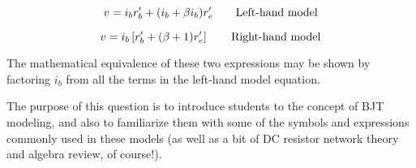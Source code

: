 $$v = i_b r'_b + (i_b + \beta i_b)r'_e \hbox{\hskip 20pt Left-hand model}$$

$$v = i_b \left[ r'_b + (\beta +1)r'_e \right] \hbox{\hskip 20pt Right-hand model}$$

The mathematical equivalence of these two expressions may be shown by factoring $i_b$ from all the terms in the left-hand model equation.







The purpose of this question is to introduce students to the concept of BJT modeling, and also to familiarize them with some of the symbols and expressions commonly used in these models (as well as a bit of DC resistor network theory and algebra review, of course!).




